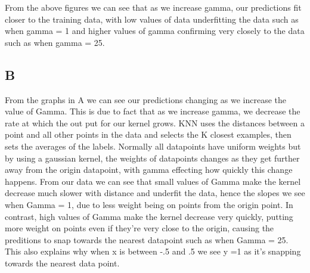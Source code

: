 \documentclass[11pt]{article} %
\begin{document}
\begin{figure}[h]
\qquad
{}
\end{figure}
From the above figures we can see that as we increase gamma, our predictions fit closer to the training data,  with low values of data underfitting the data such as when gamma = 1 and higher values of gamma confirming very closely to the data such as when gamma = 25.

\subsection{B}
From the graphs in A we can see our predictions changing as we increase the value of Gamma. This is due to fact that as we increase gamma, we decrease the rate at which the out put for our kernel grows. KNN uses the distances between a point and all other points in the data and selects the K closest examples, then sets the averages of the labels. Normally all datapoints have uniform weights but by using a gaussian kernel, the weights of datapoints changes as they get further away from the origin datapoint, with gamma effecting how quickly this change happens. From our data we can see that small values of Gamma make the kernel decrease much slower with distance and underfit the data, hence the slopes we see when Gamma = 1, due to less weight being on points from the origin point. In contrast, high values of Gamma make the kernel decrease very quickly, putting more weight on points even if they're very close to the origin, causing the preditions to snap towards the nearest datapoint such as when Gamma = 25. This also explains why when x is between -.5 and .5 we see y =1 as it's snapping towards the nearest data point. 
\end{document}
